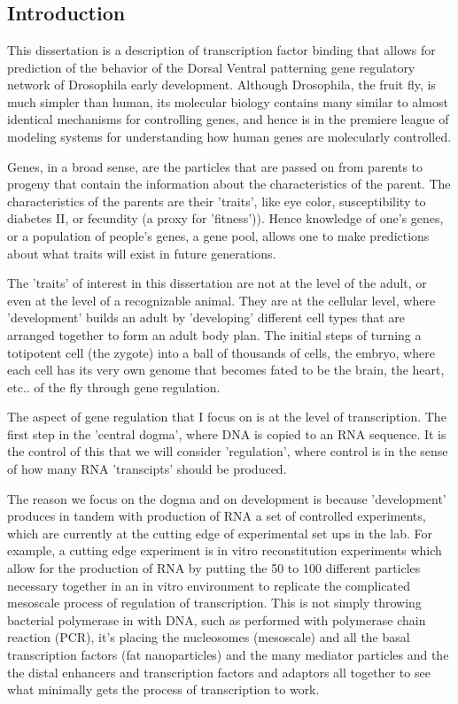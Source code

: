 \chapter{}
\section{Introduction}
This dissertation is a description of transcription factor binding that allows for prediction of the behavior of the Dorsal Ventral patterning gene regulatory network of Drosophila early development.  Although Drosophila, the fruit fly, is much simpler than human, its molecular biology contains many similar to almost identical mechanisms for controlling genes, and hence is in the premiere league of modeling systems for understanding how human genes are molecularly controlled.  

Genes, in a broad sense, are the particles that are passed on from parents to progeny that contain the information about the characteristics of the parent.  The characteristics of the parents are their 'traits', like eye color, susceptibility to diabetes II, or fecundity (a proxy for 'fitness')).  Hence knowledge of one's genes, or a population of people's genes, a gene pool, allows one to make predictions about what traits will exist in future generations.

The 'traits' of interest in this dissertation are not at the level of the adult, or even at the level of a recognizable animal.  They are at the cellular level, where 'development' builds an adult by 'developing' different cell types that are arranged together to form an adult body plan.  The initial steps of turning a totipotent cell (the zygote) into a ball of thousands of cells, the embryo, where each cell has its very own genome that becomes fated to be the brain, the heart, etc.. of the fly through gene regulation.

The aspect of gene regulation that I focus on is at the level of transcription.  The first step in the 'central dogma', where DNA is copied to an RNA sequence.  It is the control of this that we will consider 'regulation', where control is in the sense of how many RNA 'transcipts' should be produced.
  
The reason we focus on the dogma and on development is because 'development' produces in tandem with production of RNA a set of controlled experiments, which are currently at the cutting edge of experimental set ups in the lab.   For example, a cutting edge experiment is in vitro reconstitution experiments which allow for the production of RNA by putting the 50 to 100 different particles necessary together in an in vitro environment to replicate the complicated mesoscale process of regulation of transcription.  This is not simply throwing bacterial polymerase in with DNA, such as performed with polymerase chain reaction (PCR), it's placing the nucleosomes (mesoscale) and all the basal transcription factors (fat nanoparticles) and the many mediator particles and the the distal enhancers and transcription factors and adaptors all together to see what minimally gets the process of transcription to work. 

